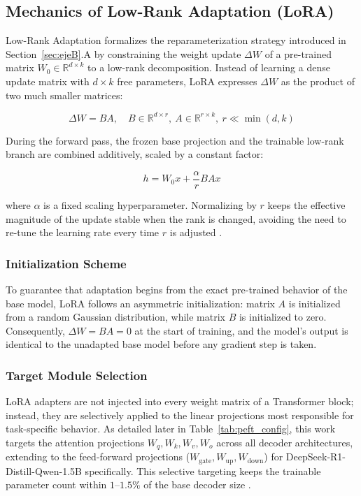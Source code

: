 \documentclass[conference]{IEEEtran}
\begin{document}
\subsection{Mechanics of Low-Rank Adaptation (LoRA)}

Low-Rank Adaptation formalizes the reparameterization strategy introduced in Section~\ref{sec:ejeB}.A by constraining the weight update $\Delta W$ of a pre-trained matrix $W_0 \in \mathbb{R}^{d \times k}$ to a low-rank decomposition. Instead of learning a dense update matrix with $d \times k$ free parameters, LoRA expresses $\Delta W$ as the product of two much smaller matrices:

\begin{equation}
    \Delta W = BA, \quad B \in \mathbb{R}^{d \times r},\ A \in \mathbb{R}^{r \times k},\ r \ll \min(d, k)
\end{equation}

During the forward pass, the frozen base projection and the trainable low-rank branch are combined additively, scaled by a constant factor:

\begin{equation}
    h = W_0 x + \frac{\alpha}{r} B A x
\end{equation}

\noindent where $\alpha$ is a fixed scaling hyperparameter. Normalizing by $r$ keeps the effective magnitude of the update stable when the rank is changed, avoiding the need to re-tune the learning rate every time $r$ is adjusted \cite{nwaiwu2025peft}.

\subsubsection{Initialization Scheme}
To guarantee that adaptation begins from the exact pre-trained behavior of the base model, LoRA follows an asymmetric initialization: matrix $A$ is initialized from a random Gaussian distribution, while matrix $B$ is initialized to zero. Consequently, $\Delta W = BA = 0$ at the start of training, and the model's output is identical to the unadapted base model before any gradient step is taken.

\subsubsection{Target Module Selection}
LoRA adapters are not injected into every weight matrix of a Transformer block; instead, they are selectively applied to the linear projections most responsible for task-specific behavior. As detailed later in Table~\ref{tab:peft_config}, this work targets the attention projections $W_q, W_k, W_v, W_o$ across all decoder architectures, extending to the feed-forward projections ($W_{\text{gate}}, W_{\text{up}}, W_{\text{down}}$) for DeepSeek-R1-Distill-Qwen-1.5B specifically. This selective targeting keeps the trainable parameter count within $1$--$1.5\%$ of the base decoder size \cite{nwaiwu2025peft, mohammed2026deepfake}.
\end{document}
